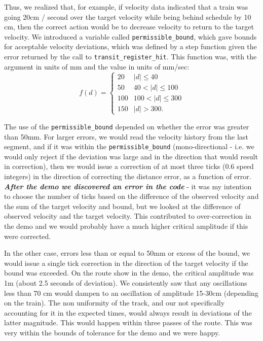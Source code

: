 \documentclass{amsart} \usepackage{amsmath} \usepackage{upgreek}
\newcommand{\x}[1]{\texttt{#1}}
\begin{document}
Thus, we realized that, for example, if velocity data indicated that a train was
going 20cm / second over the target velocity while being behind schedule by 10
cm, then the correct action would be to decrease velocity to return to the
target velocity. We introduced a variable called \x{permissible\_bound}, which
gave bounds for acceptable velocity deviations, which was defined by a step
function given the error returned by the call to \x{transit\_register\_hit}.
This function was, with the argument in units of mm and the value in units of
mm/sec: \[ f(d) = \begin{cases} 20 & |d| \leq 40 \\ 50 & 40 <  |d| \leq 100 \\
100 & 100 < |d| \leq 300 \\ 150 & |d| > 300.  \end{cases} \]

The use of the \x{permissible\_bound} depended on whether the error was greater
than 50mm. For larger errors, we would read the velocity history from the last
segment, and if it was within the \x{permissible\_bound} (mono-directional -
i.e. we would only reject if the deviation was large and in the direction that
would result in correction), then we would issue a correction of at most three
ticks (0.6 speed integers) in the direction of correcting the distance error, as
a function of error. \textbf{\textit{After the demo we discovered an error in the
code}} - it was my intention to choose the number of ticks based on the
difference of the observed velocity and the sum of the target velocity and
bound, but we looked at the difference of observed velocity and the target
velocity. This contributed to over-correction in the demo and we would probably
have a much higher critical amplitude if this were corrected.

In the other case, errors less than or equal to 50mm or excess of the bound, we
would issue a single tick correction in the direction of the target velocity if
the bound was exceeded. On the route show in the demo, the critical amplitude
was 1m (about 2.5 seconds of deviation). We consistently saw that any
oscillations less than 70 cm would dampen to an oscillation of amplitude 15-30cm
(depending on the train). The non uniformity of the track, and our not
specifically accounting for it in the expected times, would always result in
deviations of the latter magnitude. This would happen within three passes of the
route. This was very within the bounds of tolerance for the demo and we were
happy.
\end{document}
